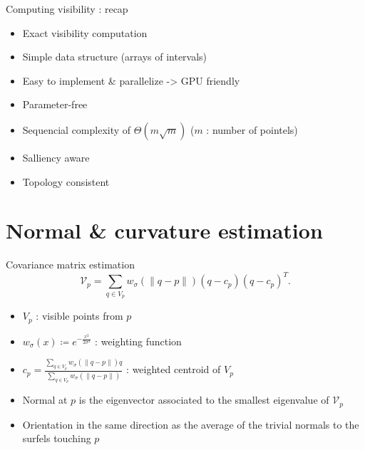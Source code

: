 \documentclass[11pt]{beamer}
\begin{document}
    \begin{frame}{Computing visibility : recap}
        \begin{itemize}
            \item Exact visibility computation
            \item Simple data structure (arrays of intervals)
            \item Easy to implement \& parallelize -> GPU friendly
            \item Parameter-free
            \item Sequencial complexity of $\Theta \left(m \sqrt{m}\right)$ ($m$ : number of pointels)
            \item Salliency aware
            \item Topology consistent
        \end{itemize}
    \end{frame}


    \section{Normal \& curvature estimation}

    \begin{frame}{Covariance matrix estimation}
        \newcommand{\Kernel}[1]{\ensuremath{w_{\sigma}(#1)}}
        \begin{equation}
            \mathcal{V}_p = \sum_{q \in V_p} \Kernel{\|q-p\|}(q - c_p)(q - c_p)^T.
        \end{equation}
        \begin{itemize}
            \item $V_p$ : visible points from $p$
            \item $\Kernel{x}\coloneqq e^{-\frac{x^2}{2\sigma^2}}$ : weighting function
            \item $c_p = \frac{\sum_{q \in V_p} \Kernel{\|q-p\|} q}{\sum_{q \in V_p} \Kernel{\|q-p\|}}$ : weighted centroid of $V_p$
            \item Normal at $p$ is the eigenvector associated to the smallest eigenvalue of $\mathcal{V}_p$
            \item Orientation in the same direction as the average of the trivial normals to the surfels touching $p$
        \end{itemize}
    \end{frame}
\end{document}
